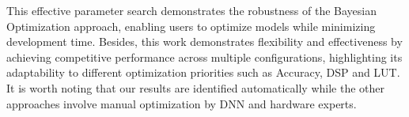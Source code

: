 This effective parameter search demonstrates the robustness of the Bayesian Optimization approach, enabling users to optimize models while minimizing development time. Besides, 
this work demonstrates flexibility and effectiveness by achieving competitive performance across multiple configurations, highlighting its adaptability to different optimization priorities such as Accuracy, DSP and LUT. 
It is worth noting that our results are identified automatically while the other approaches involve manual optimization by DNN and hardware experts.








